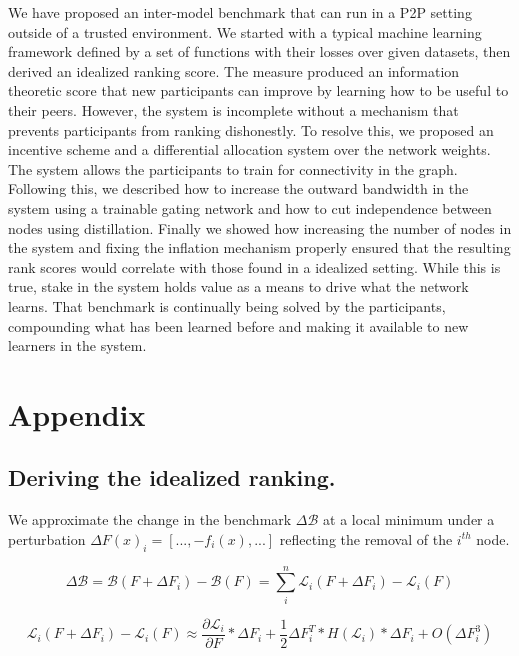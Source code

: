 \documentclass{article}
\begin{document}
We have proposed an inter-model benchmark that can run in a P2P setting outside of a trusted environment. We started with a typical machine learning framework defined by a set of functions with their losses over given datasets, then derived an idealized ranking score. The measure produced an information theoretic score that new participants can improve by learning how to be useful to their peers. However, the system is incomplete without a mechanism that prevents participants from ranking dishonestly. To resolve this, we proposed an incentive scheme and a differential allocation system over the network weights. The system allows the participants to train for connectivity in the graph. Following this, we described how to increase the outward bandwidth in the system using a trainable gating network and how to cut independence between nodes using distillation. Finally we showed how increasing the number of nodes in the system and fixing the inflation mechanism properly ensured that the resulting rank scores would correlate with those found in a idealized setting. While this is true, stake in the system holds value as a means to drive what the network learns. That benchmark is continually being solved by the participants, compounding what has been learned before and making it available to new learners in the system.

\section{Appendix}

\subsection{Deriving the idealized ranking.}

We approximate the change in the benchmark $\Delta \mathcal{B}$ at a local minimum under a perturbation $\Delta F (x)_i = [ ..., -f_i(x) , ...]$ reflecting the removal of the $i^{th}$ node.
\smallskip

\begin{equation}
\Delta \mathcal{B} = \mathcal{B}(F + \Delta F_i) - \mathcal{B}(F) = \sum_{i}^{n} \mathcal{L}_i(F + \Delta F_i) - \mathcal{L}_i(F)
\end{equation}

\begin{equation}
\mathcal{L}_i(F + \Delta F_i) - \mathcal{L}_i(F) \approx \frac{\partial \mathcal{L}_i}{\partial F} * \Delta F_i + \frac{1}{2} \Delta F_i^T * H(\mathcal{L}_i) * \Delta F_i + O(\Delta F_i^3)
\end{equation}
\end{document}
